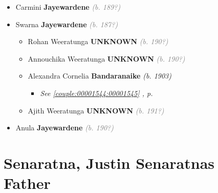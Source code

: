 \documentclass[10pt, openany]{book}
\begin{document}
\begin{itemize}
{\begin{itemize}
{\begin{itemize}
{\begin{itemize}
{\begin{itemize}
{\begin{itemize}
{ }
\item{Thiloththama \textbf{Silva} \textcolor{gray}{\textit{(b. 196?)}}
 }
\end{itemize}}
\end{itemize}
  }
\item{Manori Sharmaine \textbf{Jayewardene} \textcolor{gray}{\textit{(b. 193?)}}
  }
\end{itemize}}
\end{itemize}
 }
\item{Carmini \textbf{Jayewardene} \textcolor{gray}{\textit{(b. 189?)}}
 }
\item{Swarna \textbf{Jayewardene} \textcolor{gray}{\textit{(b. 187?)}}
\begin{itemize}
\item{Rohan Weeratunga \textbf{UNKNOWN} \textcolor{gray}{\textit{(b. 190?)}}
  }
\item{Annouchika Weeratunga \textbf{UNKNOWN} \textcolor{gray}{\textit{(b. 190?)}}
  }
\item{Alexandra Cornelia \textbf{Bandaranaike} \textcolor{slorange}{\textit{(b. 1903)}}
\begin{itemize}
\item{\textcolor{slteal}{\textit{See  \autoref{couple:00001544:00001545} \textit{, p. \pageref{couple:00001544:00001545} }}}}
\end{itemize}
  }
\item{Ajith Weeratunga \textbf{UNKNOWN} \textcolor{gray}{\textit{(b. 191?)}}
  }
\end{itemize}
 }
\item{Anula \textbf{Jayewardene} \textcolor{gray}{\textit{(b. 190?)}}
 }
\end{itemize}}
\end{itemize}
  
\part{Senaratna, Justin Senaratnas Father}
\end{document}
